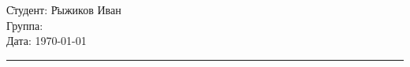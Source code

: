 \begin{tabbing}
	\hspace{11cm} \= Студент: \= Рыжиков Иван \\	%
	\> Группа:  \\	%
	\> Дата: \> \today		%
\end{tabbing}
\hrule
\vspace{1cm}